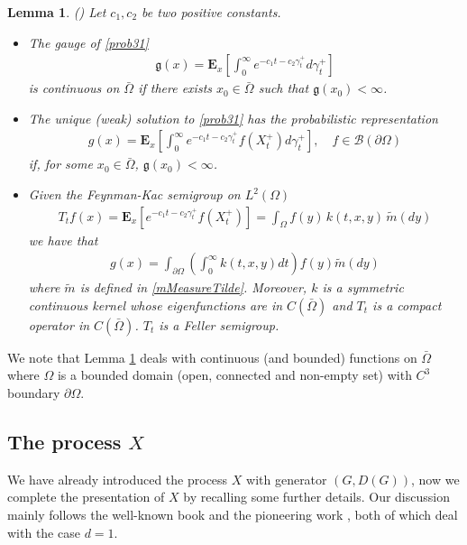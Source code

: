 \documentclass[11pt,a4paper]{article}
\newtheorem{lemma}{Lemma}
\begin{document}
\begin{lemma}
\label{lemmaPap}
(\cite{Pap90}) Let $c_1, c_2$ be two positive constants. 
\begin{itemize}
\item[i)] The gauge of \eqref{prob31}
\begin{align*}
\mathfrak{g}(x) = \mathbf{E}_x \left[ \int_0^\infty e^{-c_1 t - c_2 \gamma^+_t} d\gamma^+_t  \right]
\end{align*}
is continuous on $\bar{\Omega}$ if there exists $x_0 \in \bar{\Omega}$ such that $\mathfrak{g}(x_0)< \infty$.
\item[ii)] The unique (weak) solution to \eqref{prob31} has the probabilistic representation
\begin{align*}
g(x) = \mathbf{E}_x \left[ \int_0^\infty e^{-c_1 t - c_2 \gamma^+_t} f(X^+_t) d\gamma^+_t \right], \quad f \in \mathcal{B}(\partial \Omega) 
\end{align*}
if, for some $x_0 \in \bar{\Omega}$, $\mathfrak{g}(x_0)<\infty$.
\item[iii)] Given the Feynman-Kac semigroup on $L^2(\Omega)$
\begin{align*}
T_t f(x) = \mathbf{E}_x [e^{-c_1 t - c_2 \gamma^+_t} f(X^+_t)] = \int_{\Omega} f(y) \, k(t,x,y)\,  \tilde{m}(dy)
\end{align*}
we have that
\begin{align*}
g(x) = \int_{\partial \Omega} \left(\int_0^\infty k(t,x,y) dt \right) f(y) \tilde{m}(dy)
\end{align*}
where $\tilde{m}$ is defined in \eqref{mMeasureTilde}. Moreover, $k$ is a symmetric continuous kernel whose eigenfunctions are in $C(\bar{\Omega})$ and $T_t$ is a compact operator in $C(\bar{\Omega})$. $T_t$ is a Feller semigroup.
\end{itemize}
\end{lemma}
We note that Lemma \ref{lemmaPap} deals with continuous (and bounded) functions on $\bar{\Omega}$ where $\Omega$ is a bounded domain (open, connected and non-empty
set) with $C^3$ boundary $\partial \Omega$.

\subsection{The process $X$}
\label{sec:secX}

We have already introduced the process $X$ with generator $(G, D(G))$, now we complete the presentation of $X$ by recalling some further details. Our discussion  mainly follows the well-known book \cite{BluGet68} and the pioneering work \cite{ItoMcK}, both of which deal with the case $d=1$. 
\end{document}
